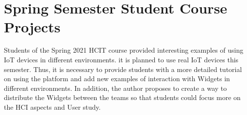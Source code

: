 \section{Spring Semester Student Course Projects}

Students of the Spring 2021 HCIT course provided interesting examples of using IoT devices in different environments. it is planned to use real IoT devices this semester. Thus, it is necessary to provide students with a more detailed tutorial on using the platform and add new examples of interaction with Widgets in different environments. In addition, the author proposes to create a way to distribute the  Widgets between the teams so that students could focus more on the HCI aspects and User study. 